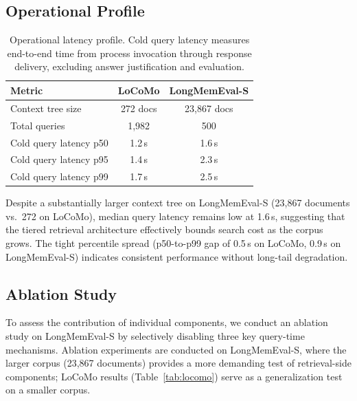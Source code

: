 \documentclass[11pt]{article}
\begin{document}
\subsection{Operational Profile}
\label{sec:efficiency}

\begin{table}[t]
\centering
\small
\begin{tabular}{@{}lcc@{}}
\toprule
\textbf{Metric} & \textbf{LoCoMo} & \textbf{LongMemEval-S} \\
\midrule
Context tree size & 272 docs & 23{,}867 docs \\
Total queries & 1{,}982 & 500 \\
\midrule
Cold query latency p50 & 1.2\,s & 1.6\,s \\
Cold query latency p95 & 1.4\,s & 2.3\,s \\
Cold query latency p99 & 1.7\,s & 2.5\,s \\
\bottomrule
\end{tabular}
\caption{Operational latency profile.
  Cold query latency measures end-to-end time from process invocation
  through response delivery, excluding answer justification and evaluation.}
\label{tab:efficiency}
\end{table}

Despite a substantially larger context tree on LongMemEval-S
(23{,}867 documents vs.\ 272 on LoCoMo),
median query latency remains low at 1.6\,s,
suggesting that the tiered retrieval architecture
effectively bounds search cost as the corpus grows.
The tight percentile spread (p50-to-p99 gap of 0.5\,s on LoCoMo,
0.9\,s on LongMemEval-S) indicates consistent performance
without long-tail degradation.


\subsection{Ablation Study}
\label{sec:ablation}

To assess the contribution of individual components,
we conduct an ablation study on LongMemEval-S by selectively disabling
three key query-time mechanisms.
Ablation experiments are conducted on LongMemEval-S,
where the larger corpus (23{,}867 documents) provides a more demanding
test of retrieval-side components;
LoCoMo results (Table~\ref{tab:locomo}) serve as a generalization
test on a smaller corpus.
\end{document}
